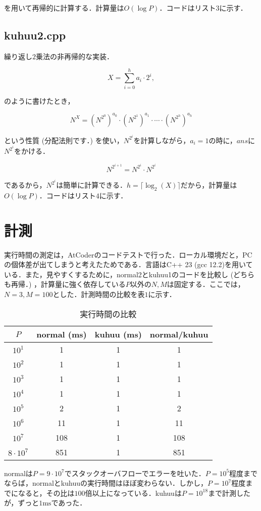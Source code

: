 \documentclass[slide,20pt]{ltjsarticle}
\begin{document}
を用いて再帰的に計算する．計算量は$O(\log P)$．コードはリスト$3$に示す．

\newpage


\newpage

\subsection*{kuhuu2.cpp}
繰り返し$2$乗法の非再帰的な実装．

\[ X = \sum_{i = 0} ^ {h} a_i \cdot 2 ^ i, \]

のように書けたとき，

\[ N ^ X = \left(N ^ {2 ^ 0}\right) ^ {a_0} \cdot \left(N ^ {2 ^ 1}\right) ^ {a_1} \cdot \cdots \cdot \left(N ^ {2 ^ h}\right) ^ {a_h} \]

という性質 (分配法則です．) を使い，$N ^ {2 ^ i}$を計算しながら，$a_i = 1$の時に，$ans$に$N ^ {2 ^ i}$をかける．

\[ N ^ {2 ^ {i + 1}} = N ^ {2 ^ {i}} \cdot N ^ {2 ^ {i}} \]

であるから，$N ^ {2 ^ i}$は簡単に計算できる．$h = \lceil \log_2(X) \rceil$だから，計算量は$O(\log P)$．コードはリスト$4$に示す．

\newpage


\section*{計測}
実行時間の測定は，AtCoderのコードテストで行った．ローカル環境だと，PCの個体差が出てしまうと考えたためである．言語はC++ 23 (gcc 12.2)を用いている．また，見やすくするために，normal2とkuhuu1のコードを比較し (どちらも再帰．) ，計算量に強く依存している$P$以外の$N, M$は固定する．ここでは，$N = 3, M = 100$とした．計測時間の比較を表$1$に示す．

\begin{center}
\begin{table}[ht]
  \centering
  \caption{実行時間の比較}
\begin{tabular}{|c|c|c|c|}  
  \hline
  $P$ & normal (ms) & kuhuu (ms) & normal/kuhuu   \\
  \hline
  $10 ^ 1$ & 1 & 1 & 1 \\
  \hline
  $10 ^ 2$ & 1 & 1 & 1 \\
  \hline
  $10 ^ 3$ & 1 & 1 & 1 \\
  \hline
  $10 ^ 4$ & 1 & 1 & 1 \\
  \hline 
  $10 ^ 5$ & 2 & 1 & 2 \\
  \hline
  $10 ^ 6$ & 11 & 1 & 11 \\
  \hline
  $10 ^ 7$ & 108 & 1 & 108 \\
  \hline 
  $8 \cdot 10 ^ 7$ & 851 & 1 & 851 \\
  \hline
\end{tabular}
\end{table}
\end{center}
normalは$P = 9 \cdot 10 ^ 7$でスタックオーバフローでエラーを吐いた．$P = 10 ^ 5$程度までならば，normalとkuhuuの実行時間はほぼ変わらない．しかし，$P = 10 ^ 7$程度までになると，その比は$100$倍以上になっている．kuhuuは$P = 10 ^ 18$まで計測したが，ずっと$1 \mathrm{ms}$であった．
\end{document}
